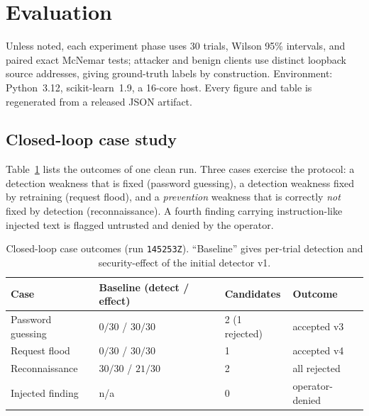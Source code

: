 \documentclass[journal]{IEEEtran}
\newcommand{\code}[1]{\texttt{\small #1}}
\begin{document}
\section{Evaluation}
\label{sec:eval}
Unless noted, each experiment phase uses 30 trials, Wilson 95\% intervals, and paired exact McNemar
tests; attacker and benign clients use distinct loopback source addresses, giving ground-truth labels
by construction. Environment: Python~3.12, scikit-learn~1.9, a 16-core host. Every figure and table is
regenerated from a released JSON artifact.

\subsection{Closed-loop case study}
\label{sec:casestudy}
Table~\ref{tab:cases} lists the outcomes of one clean run. Three cases exercise the protocol: a
detection weakness that is fixed (password guessing), a detection weakness fixed by retraining
(request flood), and a \emph{prevention} weakness that is correctly \emph{not} fixed by detection
(reconnaissance). A fourth finding carrying instruction-like injected text is flagged untrusted and
denied by the operator.

\begin{table}[t]
\caption{Closed-loop case outcomes (run \code{145253Z}). ``Baseline'' gives per-trial detection and
security-effect of the initial detector v1.}
\label{tab:cases}
\centering
\small
\begin{tabular}{@{}llll@{}}
\toprule
Case & Baseline (detect / effect) & Candidates & Outcome \\
\midrule
Password guessing & $0/30$ / $30/30$ & 2 (1 rejected) & accepted v3 \\
Request flood     & $0/30$ / $30/30$ & 1 & accepted v4 \\
Reconnaissance    & $30/30$ / $21/30$ & 2 & all rejected \\
Injected finding  & n/a & 0 & operator-denied \\
\bottomrule
\end{tabular}
\end{table}
\end{document}
